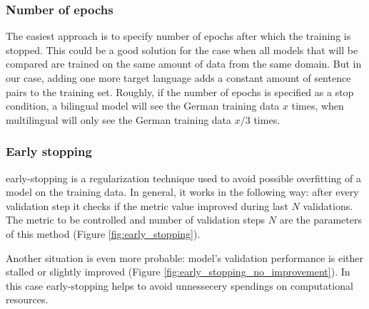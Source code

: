 \subsubsection*{Number of \glspl{epoch}}

The easiest approach is to specify number of \glspl{epoch}
after which the training is stopped.
This could be a good solution for the case when all models
that will be compared are trained on the same amount of data from
the same domain.
But in our case, adding one more target language adds a constant
amount of sentence pairs to the training set.
Roughly, if the number of \glspl{epoch} is specified as a stop
condition, a bilingual  model will see the German
training data $x$ times, when multilingual 
will only see the German training data $x / 3$ times.

\subsubsection*{Early stopping}

\Gls{early-stopping} is a regularization technique used to avoid
possible \gls{overfitting} of a model on the training data.
In general, it works in the following way: after every validation step
it checks if the metric value improved during last $N$ validations.
The metric to be controlled and number of validation steps $N$ are
the parameters of this method
(Figure \ref{fig:early_stopping}).

Another situation is even more probable: model's validation performance
is either stalled or slightly improved
(Figure \ref{fig:early_stopping_no_improvement}).
In this case \gls{early-stopping} helps to avoid unnessecery spendings
on computational resources.

